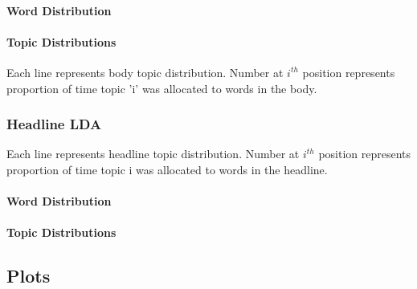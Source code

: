 \documentclass[a4paper]{article}
\begin{document}
\paragraph{Word Distribution} 


\paragraph{Topic Distributions}
Each line represents body topic distribution. Number at $i^{th}$ position represents proportion of time topic 'i' was allocated to words in the body. 



\subsubsection{Headline LDA} \label{headline lda output}
Each line represents headline topic distribution. Number at $i^{th}$ position represents proportion of time topic i was allocated to words in the headline. 
\paragraph{Word Distribution}


\paragraph{Topic Distributions}



\subsection{Plots}
\end{document}
